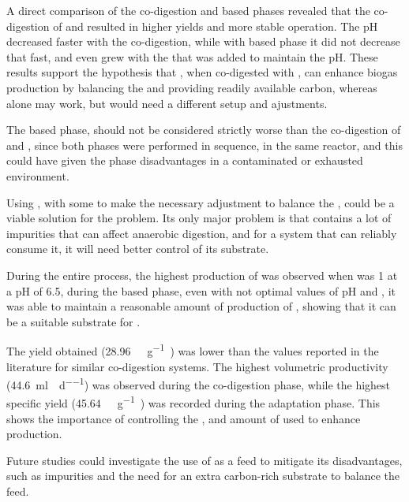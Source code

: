 \documentclass[12pt, a4paper, oneside]{report}
\begin{document}
A direct comparison of the co-digestion and  based phases revealed that the co-digestion of  and  resulted in higher  yields and more stable operation. The pH decreased faster with the co-digestion, while with  based phase it did not decrease that fast, and even grew with the  that was added to maintain the pH. These results support the hypothesis that , when co-digested with , can enhance biogas production by balancing the  and providing readily available carbon, whereas  alone may work, but would need a different setup and ajustments.

The  based phase, should not be considered strictly worse than the co-digestion of  and , since both phases were performed in sequence, in the same reactor, and this could have given the  phase disadvantages in a contaminated or exhausted environment.

Using , with some  to make the necessary adjustment to balance the , could be a viable solution for the  problem. Its only major problem is that  contains a lot of impurities that can affect anaerobic digestion, and for a system that can reliably consume it, it will need better control of its substrate.

During the entire process, the highest production of  was observed when  was \approx\num{1} at a pH of \approx\num{6.5}, during the  based phase, even with not optimal values of pH and , it was able to maintain a reasonable amount of production of , showing that it can be a suitable substrate for .

The  yield obtained (\qty{28.96}{\nml\CH\per\gram\VSfed}) was lower than the values reported in the literature for similar co-digestion systems. The highest volumetric productivity (\qty{44.6}{\milli\litre\per\reactorlitre\per\day}) was observed during the co-digestion phase, while the highest specific yield (\qty{45.64}{\nml\CH\per\gram\VSfed}) was recorded during the adaptation phase. This shows the importance of controlling the ,  and amount of  used to enhance  production.

Future studies could investigate the use of  as a feed to mitigate its disadvantages, such as impurities and the need for an extra carbon-rich substrate to balance the feed.
\clearpage{}

\printbibliography[heading=bibintoc, title={References}]
\end{document}
